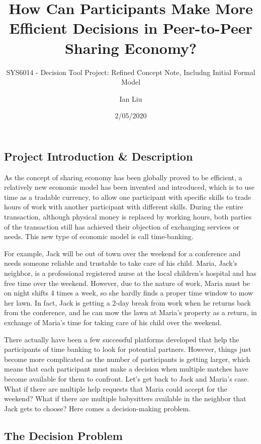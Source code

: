 \documentclass[
]{article}
\title{How Can Participants Make More Efficient Decisions in
Peer-to-Peer Sharing Economy?}
\subtitle{SYS6014 - Decision Tool Project: Refined Concept Note,
Includng Initial Formal Model}
\author{Ian Liu}
\date{2/05/2020}
\begin{document}
\maketitle

\hypertarget{project-introduction-description}{%
\subsection{Project Introduction \&
Description}\label{project-introduction-description}}

As the concept of sharing economy has been globally proved to be
efficient, a relatively new economic model has been invented and
introduced, which is to use time as a tradable currency, to allow one
participant with specific skills to trade hours of work with another
participant with different skills. During the entire transaction,
although physical money is replaced by working hours, both parties of
the transaction still has achieved their objection of exchanging
services or needs. This new type of economic model is call time-banking.

For example, Jack will be out of town over the weekend for a conference
and needs someone reliable and trustable to take care of his child.
Maria, Jack's neighbor, is a professional registered nurse at the local
children's hospital and has free time over the weekend. However, due to
the nature of work, Maria must be on night shifts 4 times a week, so she
hardly finds a proper time window to mow her lawn. In fact, Jack is
getting a 2-day break from work when he returns back from the
conference, and he can mow the lawn at Maria's property as a return, in
exchange of Maria's time for taking care of his child over the weekend.

There actually have been a few successful platforms developed that help
the participants of time banking to look for potential partners.
However, things just become more complicated as the number of
participants is getting larger, which means that each participant must
make a decision when multiple matches have become available for them to
confront. Let's get back to Jack and Maria's case. What if there are
multiple help requests that Maria could accept for the weekend? What if
there are multiple babysitters available in the neighbor that Jack gets
to choose? Here comes a decision-making problem.

\hypertarget{the-decision-problem}{%
\subsection{The Decision Problem}\label{the-decision-problem}}
\end{document}
